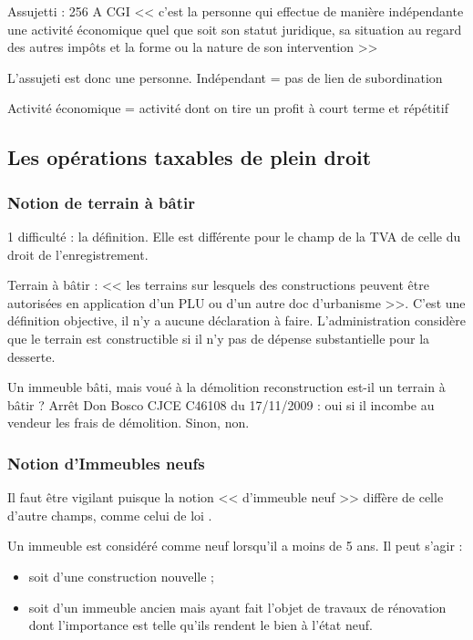 	Assujetti : 256 A CGI << c’est la personne qui effectue de manière indépendante une activité économique quel que soit son statut juridique, sa situation au regard des autres impôts et la forme ou la nature de son intervention >>

	
	L'assujeti est donc une personne. Indépendant = pas de lien de subordination

	
	Activité économique = activité dont on tire un profit à court terme et répétitif


	\subsection{Les opérations taxables de plein droit}
		
		\subsubsection{Notion de terrain à bâtir}
			
			1\iere{} difficulté : la définition. Elle est différente pour le champ de la TVA de celle du droit de l’enregistrement.

			Terrain à bâtir : << les terrains sur lesquels des constructions peuvent être autorisées en application d’un PLU ou d’un autre doc d’urbanisme >>.
			C’est une définition objective, il n’y a aucune déclaration à faire. L’administration considère que le terrain est constructible si il n’y pas de dépense substantielle pour la desserte.

			
			Un immeuble bâti, mais voué à la démolition reconstruction est-il un terrain à bâtir ? Arrêt Don Bosco CJCE C46108 du 17/11/2009 : oui si il incombe au vendeur les frais de démolition. Sinon, non.

		
		\subsubsection{Notion d’Immeubles neufs }
		
			Il faut être vigilant puisque la notion << d'immeuble neuf >> diffère de celle d'autre champs, comme celui de loi .
			
			Un immeuble est considéré comme neuf lorsqu'il a moins de 5 ans.
			Il peut s'agir :
			\begin{itemize}
				\item soit d'une construction nouvelle ;
				\item soit d'un immeuble ancien mais ayant fait l'objet de travaux de rénovation dont l'importance est telle qu'ils rendent le bien à l'état neuf.
			\end{itemize}
			
